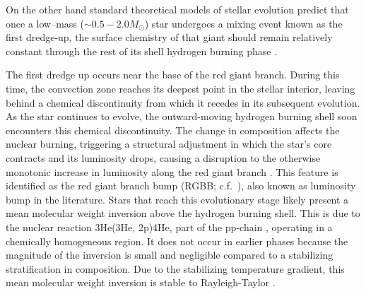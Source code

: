 On the other hand standard theoretical models of stellar evolution predict that once a low--mass ($\sim 0.5 -2.0 M_{\odot}$) star undergoes a mixing event known as the first dredge-up, the surface chemistry of that giant should remain relatively constant through the rest of its shell hydrogen burning phase \citep[e.g][]{iben1964, Iben1967}. 

The first dredge up occurs near the base of the red giant branch. During this time, the convection zone reaches its deepest point in the stellar interior, leaving behind a chemical discontinuity from which it recedes in its subsequent evolution. %
As the star continues to evolve, the outward-moving hydrogen burning shell soon encounters this chemical discontinuity. The change in composition affects the nuclear burning, 
triggering a structural adjustment in which the star's core contracts and its luminosity drops, causing a disruption to the otherwise monotonic increase in luminosity along the red giant branch \citep{Christensen-Dalsgaard:2015}. This feature is identified as the red giant branch bump (RGBB; c.f.\ \citealt{Christensen-Dalsgaard:2015, Joyce2015, Khan2018}), also known as luminosity bump in the literature. Stars that reach this evolutionary stage likely present a mean molecular weight inversion above the hydrogen burning shell. This is due to the nuclear reaction 3He(3He, 2p)4He, part of the pp-chain  \citep{Ulrich_1972}, operating in a chemically homogeneous region. It does not occur in earlier phases because the magnitude of the inversion is small and negligible compared to a stabilizing stratification in composition.
Due to the stabilizing temperature gradient, this mean molecular weight inversion is stable to Rayleigh-Taylor \citep{CantielloLanger2010}. 




